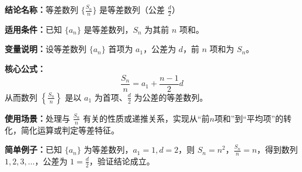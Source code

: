 \textbf{结论名称：}等差数列 \(\{\frac{S_n}{n}\}\) 是等差数列（公差 \(\frac{d}{2}\)）

\textbf{适用条件：}已知 \(\{a_n\}\) 是等差数列，\(S_n\) 为其前 \(n\) 项和。

\textbf{变量说明：}设等差数列 \(\{a_n\}\) 首项为 \(a_1\)，公差为 \(d\)，前 \(n\) 项和为 \(S_n\)。

\textbf{核心公式：}
\[
\boxed{\frac{S_n}{n} = a_1 + \frac{n-1}{2}d}
\]
从而数列 \(\left\{\frac{S_n}{n}\right\}\) 是以 \(a_1\) 为首项、\(\frac{d}{2}\) 为公差的等差数列。

\textbf{使用场景：}处理与 \(\frac{S_n}{n}\) 有关的性质或递推关系，实现从“前\(n\)项和”到“平均项”的转化，简化运算或判定等差特征。

\textbf{简单例子：}已知 \(\{a_n\}\) 为等差数列，\(a_1=1,d=2\)，则 \(S_n=n^2\)，\(\frac{S_n}{n}=n\)，得到数列 \(1,2,3,\dots\)，公差为 \(1=\frac{d}{2}\)，验证结论成立。
